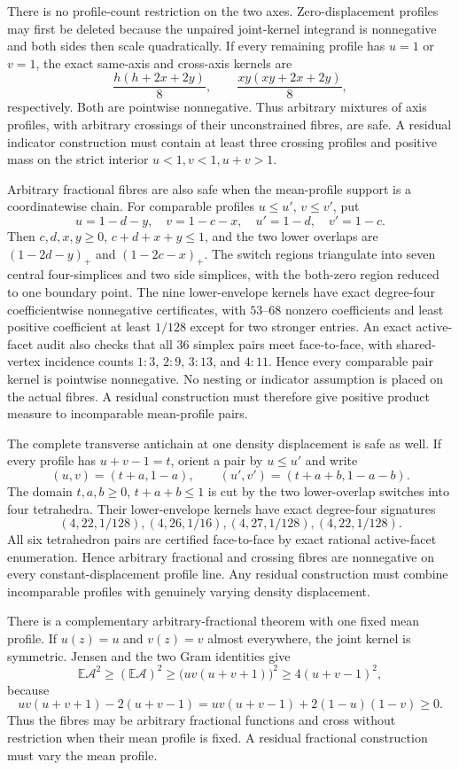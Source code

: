 \documentclass[11pt]{article}
\begin{document}
There is no profile-count restriction on the two axes.  Zero-displacement
profiles may first be deleted because the unpaired joint-kernel integrand is
nonnegative and both sides then scale quadratically.  If every remaining
profile has $u=1$ or $v=1$, the exact same-axis and cross-axis kernels are
\[
 \frac{h(h+2x+2y)}8,
 \qquad
 \frac{xy(xy+2x+2y)}8,
\]
respectively.  Both are pointwise nonnegative.  Thus arbitrary mixtures of
axis profiles, with arbitrary crossings of their unconstrained fibres, are
safe.  A residual indicator construction must contain at least three
crossing profiles and positive mass on the strict interior
$u<1,v<1,u+v>1$.

Arbitrary fractional fibres are also safe when the mean-profile support is a
coordinatewise chain.  For comparable profiles $u\leq u'$, $v\leq v'$, put
\[
 u=1-d-y,\quad v=1-c-x,
 \quad u'=1-d,\quad v'=1-c.
\]
Then $c,d,x,y\geq0$, $c+d+x+y\leq1$, and the two lower overlaps are
$(1-2d-y)_+$ and $(1-2c-x)_+$.  The switch regions triangulate into seven
central four-simplices and two side simplices, with the both-zero region
reduced to one boundary point.  The nine lower-envelope kernels have exact
degree-four coefficientwise nonnegative certificates, with $53$--$68$
nonzero coefficients and least positive coefficient at least $1/128$ except
for two stronger entries.  An exact active-facet audit also checks that all
$36$ simplex pairs meet face-to-face, with shared-vertex incidence counts
$1:3$, $2:9$, $3:13$, and $4:11$.  Hence every comparable pair kernel is
pointwise nonnegative.  No nesting or indicator assumption is placed on the
actual fibres.  A residual construction must therefore give positive product
measure to incomparable mean-profile pairs.

The complete transverse antichain at one density displacement is safe as
well.  If every profile has $u+v-1=t$, orient a pair by $u\leq u'$ and write
\[
 (u,v)=(t+a,1-a),\qquad
 (u',v')=(t+a+b,1-a-b).
\]
The domain $t,a,b\geq0$, $t+a+b\leq1$ is cut by the two lower-overlap
switches into four tetrahedra.  Their lower-envelope kernels have exact
degree-four signatures
\[
 (4,22,1/128),(4,26,1/16),(4,27,1/128),(4,22,1/128).
\]
All six tetrahedron pairs are certified face-to-face by exact rational
active-facet enumeration.
Hence arbitrary fractional and crossing fibres are nonnegative on every
constant-displacement profile line.  Any residual construction must combine
incomparable profiles with genuinely varying density displacement.

There is a complementary arbitrary-fractional theorem with one fixed mean
profile.  If $u(z)=u$ and $v(z)=v$ almost everywhere, the joint kernel is
symmetric.  Jensen and the two Gram identities give
\[
 \mathbb E\mathcal A^2\geq(\mathbb E\mathcal A)^2
 \geq\bigl(uv(u+v+1)\bigr)^2\geq4(u+v-1)^2,
\]
because
\[
 uv(u+v+1)-2(u+v-1)
 =uv(u+v-1)+2(1-u)(1-v)\geq0.
\]
Thus the fibres may be arbitrary fractional functions and cross without
restriction when their mean profile is fixed.  A residual fractional
construction must vary the mean profile.
\end{document}
